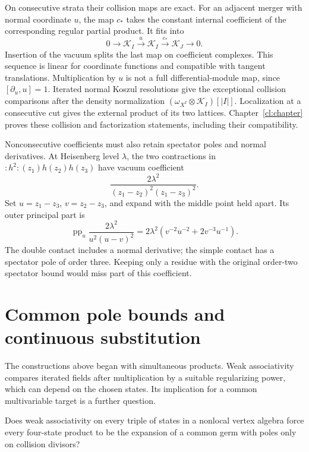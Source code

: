 On consecutive strata their collision maps are exact.
For an adjacent merger with normal coordinate \(u\),
the map \(c_*\) takes the constant internal coefficient
of the corresponding regular partial product. It fits
into
\[
 0\longrightarrow\mathcal K_I
    \xrightarrow{\ u\ }\mathcal K_I
    \xrightarrow{\ c_*\ }\mathcal K_J
    \longrightarrow0.
\]
Insertion of the vacuum splits the last map on
coefficient complexes. This sequence is linear for
coordinate functions and compatible with tangent
translations. Multiplication by \(u\) is not a full
differential-module map, since \([\partial_u,u]=1\).
Iterated normal Koszul resolutions give the exceptional
collision comparisons after the density normalization
\((\omega_{X^I}\otimes\mathcal K_I)[|I|]\).
Localization at a consecutive cut gives the external
product of its two lattices. Chapter~\ref{cl:chapter}
proves these collision and factorization statements,
including their compatibility.

Nonconsecutive coefficients must also retain spectator
poles and normal derivatives. At Heisenberg level
\(\lambda\), the two contractions in
\(:h^2:(z_1)h(z_2)h(z_3)\) have vacuum coefficient
\[
 \frac{2\lambda^2}{(z_1-z_2)^2(z_1-z_3)^2}.
\]
Set \(u=z_1-z_3\), \(v=z_2-z_3\), and expand with
the middle point held apart. Its outer principal part is
\[
 \operatorname{pp}_u
       \frac{2\lambda^2}{u^2(u-v)^2}
   =2\lambda^2\left(v^{-2}u^{-2}+2v^{-3}u^{-1}\right).
\]
The double contact includes a normal derivative; the
simple contact has a spectator pole of order three.
Keeping only a residue with the original order-two
spectator bound would miss part of this coefficient.

\section{Common pole bounds and continuous substitution}

The constructions above began with simultaneous products.
Weak associativity compares iterated fields after
multiplication by a suitable regularizing power, which
can depend on the chosen states. Its implication for
a common multivariable target is a further question.

\begin{question}\label{e1f:qn:simultaneity}
Does weak associativity on every triple of states in a
nonlocal vertex algebra force every four-state product
to be the expansion of a common germ with poles only
on collision divisors?
\end{question}

